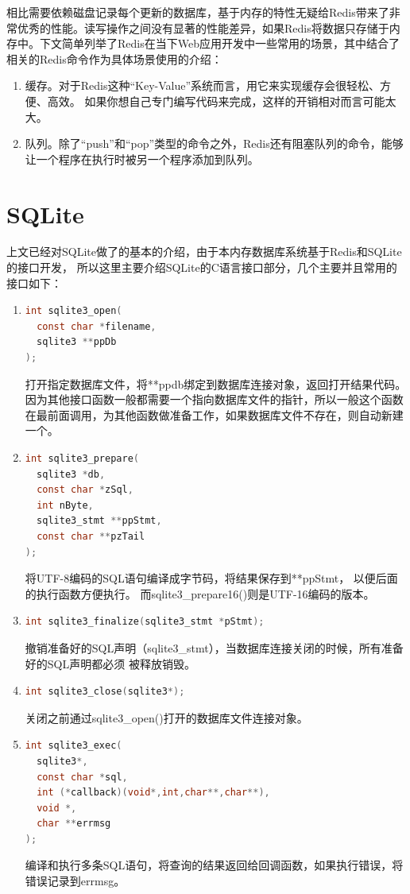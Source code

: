 \documentclass{zjutthesis}
\begin{document}
相比需要依赖磁盘记录每个更新的数据库，基于内存的特性无疑给Redis带来了非常优秀的性能\cite{郝伟2010湖南移动网管集中云存储平台搭建与测试}。读写操作之间没有显著的性能差异，如果Redis将数据只存储于内存中。下文简单列举了Redis在当下Web应用开发中一些常用的场景，其中结合了相关的Redis命令作为具体场景使用的介绍：

\begin{enumerate}[label=（\arabic*）]

\item{缓存。对于Redis这种“Key-Value”系统而言，用它来实现缓存会很轻松、方便、高效。
如果你想自己专门编写代码来完成，这样的开销相对而言可能太大。}

\item{队列。除了“push”和“pop”类型的命令之外，Redis还有阻塞队列的命令，能够让一个程序在执行时被另一个程序添加到队列。}

\end{enumerate}

\section{SQLite}
上文已经对SQLite做了的基本的介绍，由于本内存数据库系统基于Redis和SQLite的接口开发， 所以这里主要介绍SQLite的C语言接口部分，几个主要并且常用的接口如下：
\begin{enumerate}[label=（\arabic*）]
\item{
\begin{lstlisting}[language=C]
int sqlite3_open(
  const char *filename,
  sqlite3 **ppDb
);
\end{lstlisting}
打开指定数据库文件，将**ppdb绑定到数据库连接对象，返回打开结果代码。因为其他接口函数一般都需要一个指向数据库文件的指针，所以一般这个函数在最前面调用，为其他函数做准备工作，如果数据库文件不存在，则自动新建一个。
}
\item{
\begin{lstlisting}[language=C]
int sqlite3_prepare(
  sqlite3 *db,
  const char *zSql,
  int nByte,
  sqlite3_stmt **ppStmt,
  const char **pzTail
);
\end{lstlisting}
将UTF-8编码的SQL语句编译成字节码，将结果保存到**ppStmt，
以便后面的执行函数方便执行。
而sqlite3\_prepare16()则是UTF-16编码的版本。
}
\item{
\begin{lstlisting}[language=C]
int sqlite3_finalize(sqlite3_stmt *pStmt);
\end{lstlisting}
撤销准备好的SQL声明（sqlite3\_stmt），当数据库连接关闭的时候，所有准备好的SQL声明都必须
被释放销毁。
}
\item{
\begin{lstlisting}[language=C]
int sqlite3_close(sqlite3*);
\end{lstlisting}
关闭之前通过sqlite3\_open()打开的数据库文件连接对象。
}
\item{
\begin{lstlisting}[language=C]
int sqlite3_exec(
  sqlite3*,
  const char *sql,
  int (*callback)(void*,int,char**,char**),
  void *,
  char **errmsg
);
\end{lstlisting}
编译和执行多条SQL语句，将查询的结果返回给回调函数，如果执行错误，将错误记录到errmsg。
}
\end{enumerate}
\end{document}
